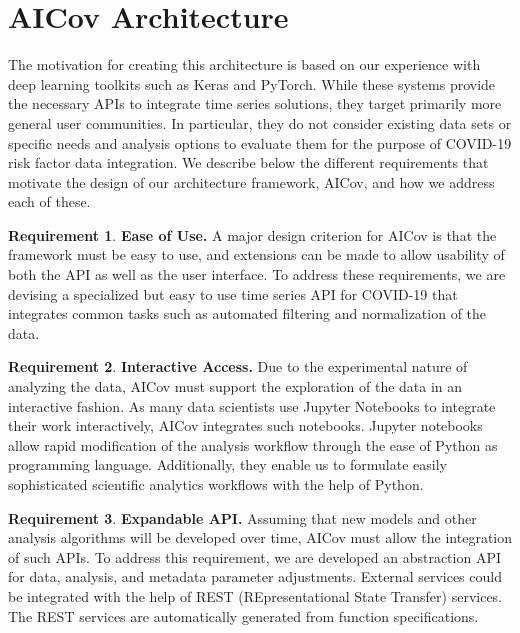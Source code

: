 \documentclass[12pt]{article}
\theoremstyle{definition}
\newtheorem{requirement}{Requirement}
\renewcommand{\_}{%
    \textunderscore\hspace{0pt}%
}
\begin{document}
\section{AICov Architecture}
\label{sec:arch}

The motivation for creating this architecture is based on our
experience with deep learning toolkits such as Keras and
PyTorch. While these systems provide the necessary APIs to integrate
time series solutions, they target primarily more general user
communities. In particular, they do not consider existing data sets or
specific needs and analysis options to evaluate them for the purpose
of COVID-19 risk factor data integration. We describe below the
different requirements that motivate the design of our architecture
framework, AICov, and how we address each of these.

\newcommand{\Solution}{}

\begin{requirement}{\bf Ease of Use.}
  A major design criterion for AICov is that the framework must be
  easy to use, and extensions can be made to allow usability of both
  the API as well as the user interface. \Solution To address these
  requirements, we are devising a specialized but easy to use time
  series API for COVID-19 that integrates common tasks such as
  automated filtering and normalization of the data.
\end{requirement}


\begin{requirement}{\bf Interactive Access.}
  Due to the experimental nature of analyzing the data, AICov must
  support the exploration of the data in an interactive
  fashion. \Solution As many data scientists use Jupyter Notebooks to
  integrate their work interactively, AICov integrates such
  notebooks. Jupyter notebooks allow rapid modification of the
  analysis workflow through the ease of Python as programming
  language. Additionally, they enable us to formulate easily
  sophisticated scientific analytics workflows with the help of
  Python.
\end{requirement}


\begin{requirement}{\bf Expandable API.}
  Assuming that new models and other analysis algorithms will be
  developed over time, AICov must allow the integration of such
  APIs. \Solution To address this requirement, we are developed an
  abstraction API for data, analysis, and metadata parameter
  adjustments. External services could be integrated with the help of
  REST (REpresentational State Transfer) services. The REST services
  are automatically generated from function specifications.
\end{requirement}
\end{document}
